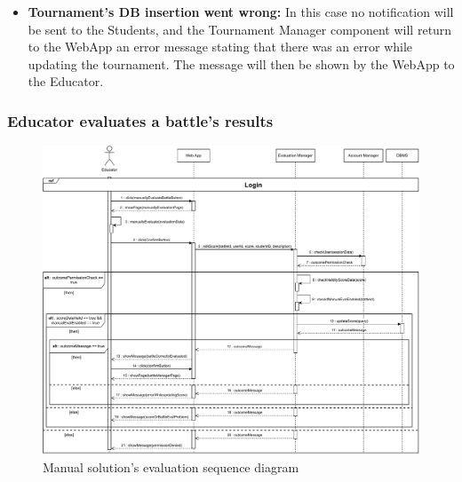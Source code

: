 \documentclass{article}
\begin{document}
{\begin{itemize}
            Tournament Manager component just return an error message to the WebApp stating 
            that the closure of the tournament has been denied since there is still at least
            one battle active within it. The message will be shown then to the Educator by the 
            WebApp.
            \item \textbf{Tournament's DB insertion went wrong:} In this case no 
            notification will be sent to the Students, and the Tournament Manager component will 
            return to the WebApp an error message stating that there was an error while 
            updating the tournament.
            The message will then be shown by the WebApp to the Educator.
        \end{itemize}


    \subsubsection{Educator evaluates a battle's results}
        \begin{figure}[H]
            \centering
            \hspace*{-3.5cm}\includegraphics[scale=0.65]{Sequence/Sequence8DD.pdf}
            \caption{Manual solution's evaluation sequence diagram}
            \label{fig:Sequence8DD}
        \end{figure}
        
}
\end{document}
